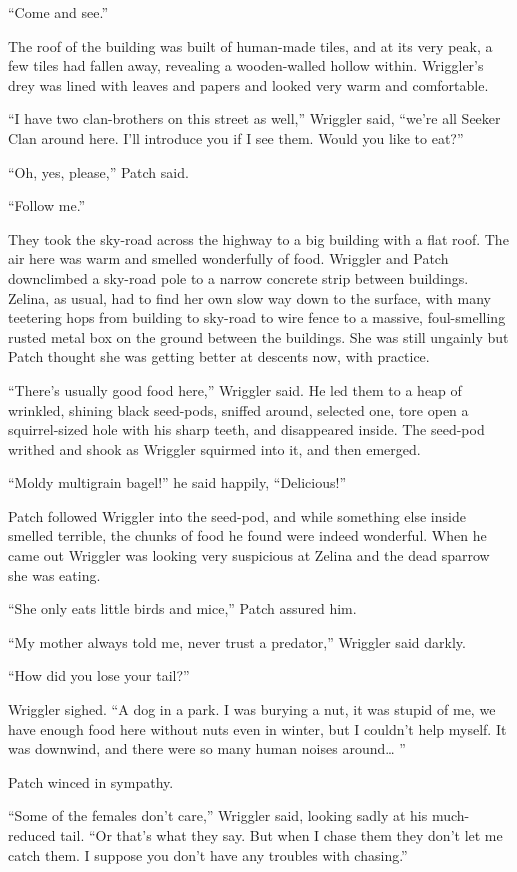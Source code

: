 \documentclass[ebook,oneside,openany,17pt]{memoir}
\begin{document}
“Come and see.”

The roof of the building was built of human-made tiles, and at its
very peak, a few tiles had fallen away, revealing a wooden-walled
hollow within. Wriggler’s drey was lined with leaves and papers and
looked very warm and comfortable.

“I have two clan-brothers on this street as well,” Wriggler said,
“we’re all Seeker Clan around here. I’ll introduce you if I see
them. Would you like to eat?”

“Oh, yes, please,” Patch said.

“Follow me.”

They took the sky-road across the highway to a big building with a
flat roof. The air here was warm and smelled wonderfully of
food. Wriggler and Patch downclimbed a sky-road pole to a narrow
concrete strip between buildings. Zelina, as usual, had to find her
own slow way down to the surface, with many teetering hops from
building to sky-road to wire fence to a massive, foul-smelling rusted
metal box on the ground between the buildings. She was still ungainly
but Patch thought she was getting better at descents now, with
practice.

“There’s usually good food here,” Wriggler said. He led them to a heap
of wrinkled, shining black seed-pods, sniffed around, selected one,
tore open a squirrel-sized hole with his sharp teeth, and disappeared
inside. The seed-pod writhed and shook as Wriggler squirmed into it,
and then emerged.

“Moldy multigrain bagel!” he said happily, “Delicious!”

Patch followed Wriggler into the seed-pod, and while something else
inside smelled terrible, the chunks of food he found were indeed
wonderful. When he came out Wriggler was looking very suspicious at
Zelina and the dead sparrow she was eating.

“She only eats little birds and mice,” Patch assured him.

“My mother always told me, never trust a predator,” Wriggler said
darkly.

“How did you lose your tail?”

Wriggler sighed. “A dog in a park. I was burying a nut, it was stupid
of me, we have enough food here without nuts even in winter, but I
couldn’t help myself. It was downwind, and there were so many human
noises around… ”

Patch winced in sympathy.

“Some of the females don’t care,” Wriggler said, looking sadly at his
much-reduced tail. “Or that’s what they say. But when I chase them
they don’t let me catch them. I suppose you don’t have any troubles
with chasing.”
\end{document}
